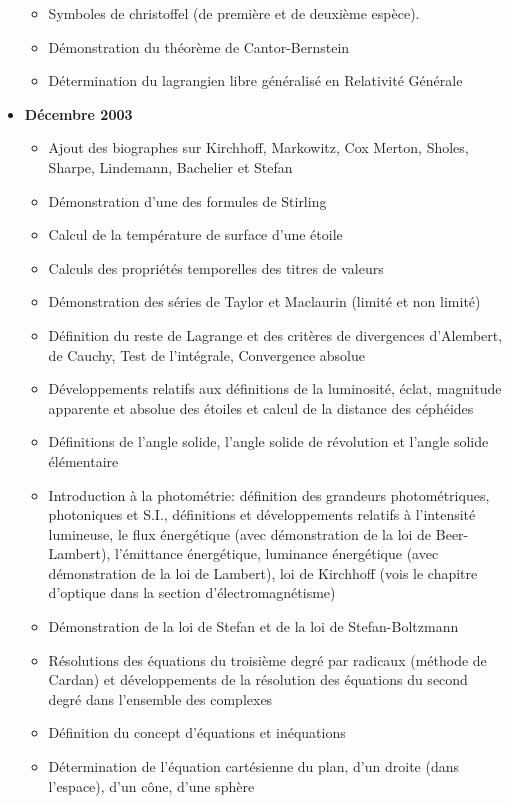 \documentclass[12pt,a4paper,twoside,openright]{report}
\theoremstyle{definition}
\theoremstyle{itexmp}
\numberwithin{equation}{section}
\begin{document}
\begin{itemize}
\begin{itemize}[noitemsep]
				\item Symboles de christoffel (de première et de deuxième espèce).
				\item Démonstration du théorème de Cantor-Bernstein
				\item Détermination du lagrangien libre généralisé en Relativité Générale
			\end{itemize}
		\item \textbf{Décembre 2003}
			\begin{itemize}[noitemsep]
				\item Ajout des biographes sur Kirchhoff, Markowitz, Cox Merton, Sholes, Sharpe, Lindemann, Bachelier et Stefan 
				\item Démonstration d'une des formules de Stirling
				\item Calcul de la température de surface d'une étoile
				\item Calculs des propriétés temporelles des titres de valeurs
				\item Démonstration des séries de Taylor et Maclaurin (limité et non limité)
				\item Définition du reste de Lagrange et des critères de divergences d'Alembert, de Cauchy, Test de l'intégrale, Convergence absolue
				\item Développements relatifs aux définitions de la luminosité, éclat, magnitude apparente et absolue des étoiles et calcul de la distance des céphéides
				\item Définitions de l'angle solide, l'angle solide de révolution et l'angle solide élémentaire
				\item Introduction à la photométrie: définition des grandeurs photométriques, photoniques et S.I., définitions et développements relatifs à l'intensité lumineuse, le flux énergétique (avec démonstration de la loi de Beer-Lambert), l'émittance énergétique, luminance énergétique (avec démonstration de la loi de Lambert), loi de Kirchhoff (vois le chapitre d'optique dans la section d'électromagnétisme)
				\item Démonstration de la loi de Stefan et de la loi de Stefan-Boltzmann
				\item Résolutions des équations du troisième degré par radicaux (méthode de Cardan) et développements de la résolution des équations du second degré dans l'ensemble des complexes
				\item Définition du concept d'équations et inéquations
				\item Détermination de l'équation cartésienne du plan, d'un droite (dans l'espace), d'un cône, d'une sphère

\end{itemize}
\end{itemize}
\end{document}
